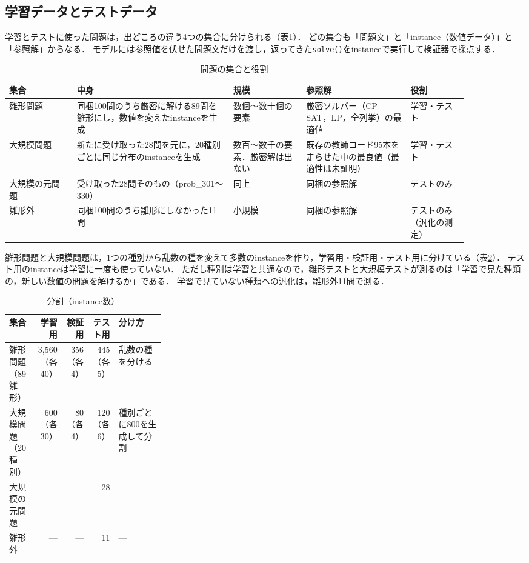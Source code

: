 \documentclass[12pt,a4paper]{article}
\begin{document}
\subsection{学習データとテストデータ}

学習とテストに使った問題は，出どころの違う4つの集合に分けられる（表\ref{tab:sets}）．
どの集合も「問題文」と「instance（数値データ）」と「参照解」からなる．
モデルには参照値を伏せた問題文だけを渡し，返ってきた\texttt{solve()}をinstanceで実行して検証器で採点する．

\begin{table}[H]
  \centering
  \caption{問題の集合と役割}
  \label{tab:sets}
  \small
  \begin{tabular}{p{0.13\linewidth}p{0.30\linewidth}p{0.14\linewidth}p{0.20\linewidth}p{0.11\linewidth}}
    \toprule
    集合 & 中身 & 規模 & 参照解 & 役割 \\
    \midrule
    雛形問題 & 同梱100問のうち厳密に解ける89問を雛形にし，数値を変えたinstanceを生成 & 数個〜数十個の要素 & 厳密ソルバー（CP-SAT，LP，全列挙）の最適値 & 学習・テスト \\
    大規模問題 & 新たに受け取った28問を元に，20種別ごとに同じ分布のinstanceを生成 & 数百〜数千の要素．厳密解は出ない & 既存の教師コード95本を走らせた中の最良値（最適性は未証明） & 学習・テスト \\
    大規模の元問題 & 受け取った28問そのもの（prob\_301〜330） & 同上 & 同梱の参照解 & テストのみ \\
    雛形外 & 同梱100問のうち雛形にしなかった11問 & 小規模 & 同梱の参照解 & テストのみ（汎化の測定） \\
    \bottomrule
  \end{tabular}
\end{table}

雛形問題と大規模問題は，1つの種別から乱数の種を変えて多数のinstanceを作り，学習用・検証用・テスト用に分けている（表\ref{tab:split}）．
テスト用のinstanceは学習に一度も使っていない．
ただし種別は学習と共通なので，雛形テストと大規模テストが測るのは「学習で見た種類の，新しい数値の問題を解けるか」である．
学習で見ていない種類への汎化は，雛形外11問で測る．

\begin{table}[H]
  \centering
  \caption{分割（instance数）}
  \label{tab:split}
  \small
  \begin{tabular}{lrrrp{0.30\linewidth}}
    \toprule
    集合 & 学習用 & 検証用 & テスト用 & 分け方 \\
    \midrule
    雛形問題（89雛形） & 3,560（各40） & 356（各4） & 445（各5） & 乱数の種を分ける \\
    大規模問題（20種別） & 600（各30） & 80（各4） & 120（各6） & 種別ごとに800を生成して分割 \\
    大規模の元問題 & --- & --- & 28 & --- \\
    雛形外 & --- & --- & 11 & --- \\
    \bottomrule
  \end{tabular}
\end{table}
\end{document}
